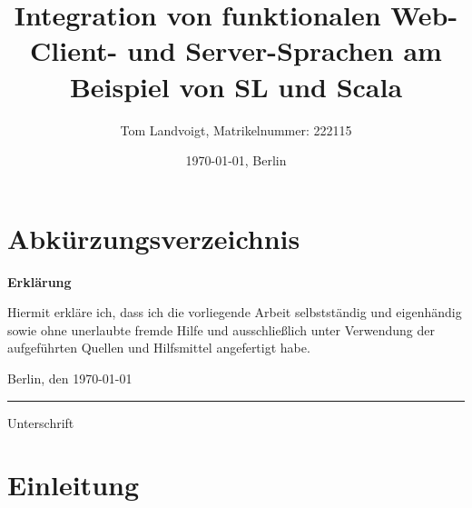 \documentclass[12pt,bibtotoc]{scrreprt}
\title{Integration von funktionalen Web-Client- und Server-Sprachen am Beispiel von SL und Scala}
\author{Tom Landvoigt, Matrikelnummer: 222115}
\date{\today{}, Berlin}
\begin{document}
\maketitle
\tableofcontents   %
\listoffigures     %
\listoftables      %
\lstlistoflistings %

\chapter*{Abkürzungsverzeichnis}
\begin{acronym}[TU-Berlin]
\setlength{\itemsep}{-0.3\parsep}
 \acro{}{}
\end{acronym}


\newpage
\thispagestyle{empty}		%
\begin{LARGE}
	\textbf{Erklärung}
\end{LARGE}

\vspace{1cm}

Hiermit erkläre ich, dass ich die vorliegende Arbeit selbstständig und eigenhändig sowie ohne unerlaubte fremde Hilfe und ausschließlich unter Verwendung der aufgeführten Quellen und Hilfsmittel angefertigt habe.
\vspace{2cm}

Berlin, den \today

\vspace{1cm}

\rule{0.3\textwidth}{0.4pt}

Unterschrift

\vspace*{6cm}
\newpage


\lstset{basicstyle=\ttfamily\small, numbers=left, numberstyle=\tiny}

\chapter*{Einleitung}
\setcounter{page}{1}
\end{document}
